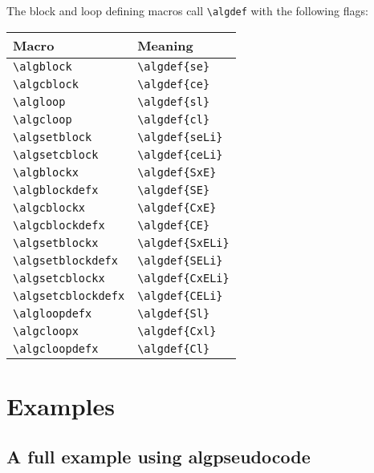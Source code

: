 \documentclass{article}
\begin{document}
\begin{minipage}[b]{0.5\linewidth}
\begin{minipage}[b]{0.5\linewidth}
\begin{minipage}[b]{0.5\linewidth}
\begin{minipage}[b]{0.5\linewidth}
\begin{minipage}[b]{0.5\linewidth}
\begin{minipage}[b]{0.5\linewidth}
\begin{minipage}[b]{0.5\linewidth}
The block and loop defining macros call \verb:\algdef: with the following flags:
\begin{center}
\begin{tabular}{|l|l|}
\hline
\textbf{Macro}&\textbf{Meaning}\\
\hline
\verb:\algblock:&\verb:\algdef{se}:\\
\hline
\verb:\algcblock:&\verb:\algdef{ce}:\\
\hline
\verb:\algloop:&\verb:\algdef{sl}:\\
\hline
\verb:\algcloop:&\verb:\algdef{cl}:\\
\hline
\verb:\algsetblock:&\verb:\algdef{seLi}:\\
\hline
\verb:\algsetcblock:&\verb:\algdef{ceLi}:\\
\hline
\verb:\algblockx:&\verb:\algdef{SxE}:\\
\hline
\verb:\algblockdefx:&\verb:\algdef{SE}:\\
\hline
\verb:\algcblockx:&\verb:\algdef{CxE}:\\
\hline
\verb:\algcblockdefx:&\verb:\algdef{CE}:\\
\hline
\verb:\algsetblockx:&\verb:\algdef{SxELi}:\\
\hline
\verb:\algsetblockdefx:&\verb:\algdef{SELi}:\\
\hline
\verb:\algsetcblockx:&\verb:\algdef{CxELi}:\\
\hline
\verb:\algsetcblockdefx:&\verb:\algdef{CELi}:\\
\hline
\verb:\algloopdefx:&\verb:\algdef{Sl}:\\
\hline
\verb:\algcloopx:&\verb:\algdef{Cxl}:\\
\hline
\verb:\algcloopdefx:&\verb:\algdef{Cl}:\\
\hline
\end{tabular}
\end{center}


\vfill
\section{Examples}
\subsection{A full example using \textbf{algpseudocode}}



\end{minipage}
\end{minipage}
\end{minipage}
\end{minipage}
\end{minipage}
\end{minipage}
\end{minipage}
\end{document}
